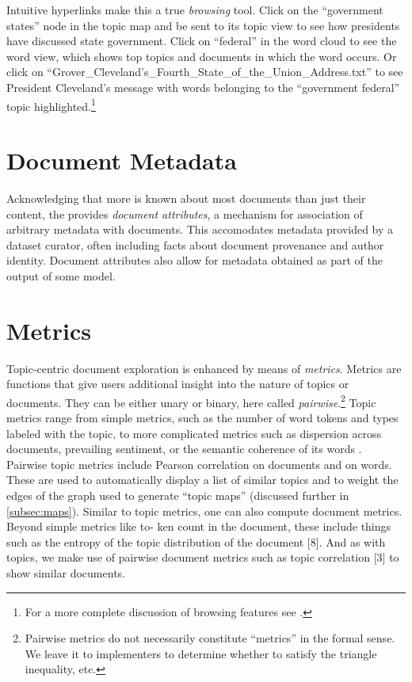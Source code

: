 \documentclass[11pt]{article}
\begin{document}
Intuitive hyperlinks make this a true \textit{browsing} tool. Click on the
``government states'' node in the topic map and be sent to its topic view to see
how presidents have discussed state government. Click on ``federal'' in the word
cloud to see the word view, which shows top topics and documents in which the
word occurs. Or click on ``Grover\_\allowbreak{}Cleveland's\_\allowbreak{}Fourth\_\allowbreak{}State\_\allowbreak{}of\_\allowbreak{}the\_\allowbreak{}Union\_\allowbreak{}Address.txt''
to see President Cleveland's message with words belonging to the ``government federal''
topic highlighted.\footnote{For a more complete discussion
of browsing features see \cite{gardner_browser_2010}.}%

\section{Document Metadata}
Acknowledging that more is known about most documents than just their content,
the \tool{} provides \textit{document attributes}, a mechanism for association
of arbitrary metadata with documents. This accomodates metadata
provided by a dataset curator, often including facts about document
provenance and author identity. Document attributes also allow for metadata
obtained as part of the output of some model.

\section{Metrics}
Topic-centric document exploration is enhanced by means of \textit{metrics}.
Metrics are functions that give users additional insight into the nature of
topics or documents. They can be either unary or binary, here called
\textit{pairwise}.\footnote{Pairwise metrics do not necessarily constitute
``metrics'' in the formal sense. We leave it to implementers to determine
whether to satisfy the triangle inequality, etc.} Topic metrics range from
simple metrics, such as the number of word tokens and types labeled with the
topic, to more complicated metrics such as dispersion across documents,
prevailing sentiment, or the semantic coherence of its words \cite{Newman2010}.
Pairwise topic metrics include Pearson correlation on documents and on words.
These are used to automatically display a list of similar topics and to weight
the edges of the graph used to generate ``topic maps'' (discussed further in
\ref{subsec:maps}). Similar to topic metrics, one can also compute document
metrics. Beyond simple metrics like to- ken count in the document, these include
things such as the entropy of the topic distribution of the document [8]. And as
with topics, we make use of pairwise document metrics such as topic%
correlation [3] to show similar documents.%
\end{document}
